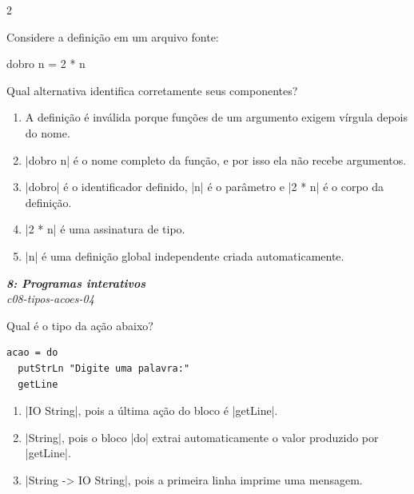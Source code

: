\documentclass[a4paper,10pt,brazil]{article}
\begin{document}
\begin{multicols}{2}
\begin{flushright}
\end{flushright}
Considere a definição em um arquivo fonte:

\begin{haskellcode}
dobro n = 2 * n
\end{haskellcode}

Qual alternativa identifica corretamente seus componentes?

\begin{enumerate}
  \item A definição é inválida porque funções de um argumento exigem vírgula depois do nome.

  \item \haskellinline|dobro n| é o nome completo da função, e por isso ela não recebe argumentos.

  \item \haskellinline|dobro| é o identificador definido, \haskellinline|n| é o parâmetro e \haskellinline|2 * n| é o corpo da definição.

  \item \haskellinline|2 * n| é uma assinatura de tipo.

  \item \haskellinline|n| é uma definição global independente criada automaticamente.


\end{enumerate}

\begin{flushright}
  \footnotesize
  \textit{\textbf{8: Programas interativos}}\\
  \textit{c08-tipos-acoes-04}\\

\end{flushright}
Qual é o tipo da ação abaixo?

\begin{verbatim}
acao = do
  putStrLn "Digite uma palavra:"
  getLine
\end{verbatim}

\begin{enumerate}
  \item \haskellinline|IO String|, pois a última ação do bloco é \haskellinline|getLine|.

  \item \haskellinline|String|, pois o bloco \haskellinline|do| extrai automaticamente o valor produzido por \haskellinline|getLine|.

  \item \haskellinline|String -> IO String|, pois a primeira linha imprime uma mensagem.


\end{enumerate}
\end{multicols}
\end{document}
